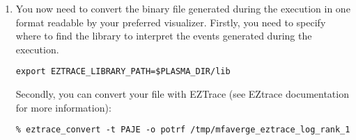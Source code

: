 \begin{enumerate}
\item You now need to convert the binary file generated during the
  execution in one format
  readable by your preferred visualizer. Firstly, you need to specify
  where to find the library to interpret the events generated during
  the execution.
\begin{verbatim}
export EZTRACE_LIBRARY_PATH=$PLASMA_DIR/lib
\end{verbatim}

Secondly, you can convert your file with EZTrace (see EZtrace
documentation for more information):
\begin{verbatim}
% eztrace_convert -t PAJE -o potrf /tmp/mfaverge_eztrace_log_rank_1
\end{verbatim}

\end{enumerate}


